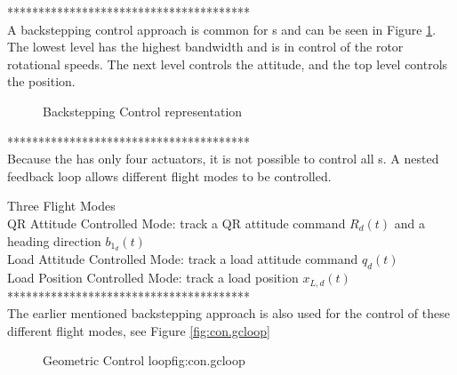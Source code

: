 ***************************************\\

A backstepping control approach is common for s and can be seen in Figure \ref{fig:con.backstepQR}. The lowest level has the highest bandwidth and is in control of the rotor rotational speeds. The next level controls the  attitude, and the top level controls the  position. 

\begin{figure}[h!]
	\centering
	\caption{Backstepping Control representation\label{fig:con.backstepQR}}
\end{figure}		


***************************************\\
Because the  has only four actuators, it is not possible to control all s. A nested feedback loop allows different flight modes to be controlled.

Three Flight Modes\\
QR Attitude Controlled Mode: track a QR attitude command $ R_d(t) $ and a heading direction $ b_{1_d}(t) $ \\
Load Attitude Controlled Mode: track a load attitude command $ q_d(t) $ \\
Load Position Controlled Mode: track a load position $ x_{L,d}(t) $\\

***************************************\\

The earlier mentioned backstepping approach is also used for the control of these different flight modes, see Figure \ref{fig:con.gcloop}\\

\begin{figure}[h!]
	\centering
	\caption{Geometric Control loop{fig:con.gcloop}}
\end{figure}		


